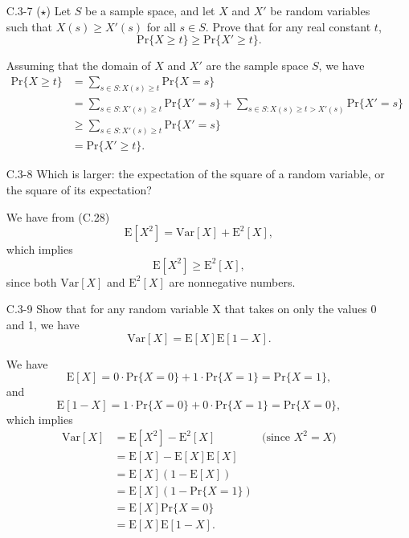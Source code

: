 \documentclass{report}
\makeatletter
\renewenvironment{framed}{%
 \def\FrameCommand##1{\hskip\@totalleftmargin
 \fboxsep=\FrameSep\fbox{##1}}%
 \MakeFramed {\advance\hsize-\width
   \@totalleftmargin\z@ \linewidth\hsize
   \@setminipage}}%
 {\par\unskip\endMakeFramed}
\makeatother
\begin{document}
\begin{enumerate}
\newpage

\item[C.3{-}7]{($\star$) Let $S$ be a sample space, and let $X$ and $X'$ be
random variables such that $X(s) \ge X'(s)$ for all $s \in S$. Prove that for
any real constant $t$,
\[
  \text{Pr}\{X \ge t\} \ge \text{Pr}\{X' \ge t\}.
\]
}

\begin{framed}
Assuming that the domain of $X$ and $X'$ are the sample space $S$, we have
\begin{equation*}
\begin{aligned}
  \text{Pr}\{X \ge t\} &=   \sum_{s \in S:X(s) \ge t}{\text{Pr}\{X = s\}}\\
                       &=   \sum_{s \in S:X'(s) \ge t}{\text{Pr}\{X' = s\}} + \sum_{s \in S:X(s) \ge t > X'(s)}{\text{Pr}\{X' = s\}}\\
                       &\ge \sum_{s \in S:X'(s) \ge t}{\text{Pr}\{X' = s\}}\\
                       &=   \text{Pr}\{X' \ge t\}.
\end{aligned}
\end{equation*}
\end{framed}

\item[C.3{-}8]{Which is larger: the expectation of the square of a random
variable, or the square of its expectation?}

\begin{framed}
We have from (C.28)
\[
  \text{E}[X^2] = \text{Var}[X] + \text{E}^2[X],
\]
which implies
\[
  \text{E}[X^2] \ge \text{E}^2[X],
\]
since both $\text{Var}[X]$ and $\text{E}^2[X]$ are nonnegative numbers.

\end{framed}

\item[C.3{-}9]{Show that for any random variable X that takes on only the values
0 and 1, we have
\[
  \text{Var}[X] = \text{E}[X] \text{E}[1 - X].
\]
}

\begin{framed}
We have
\[
  \text{E}[X] = 0 \cdot \text{Pr}\{X = 0\} + 1 \cdot \text{Pr}\{X = 1\} = \text{Pr}\{X = 1\},
\]
and
\[
  \text{E}[1 - X] = 1 \cdot \text{Pr}\{X = 0\} + 0 \cdot \text{Pr}\{X = 1\} = \text{Pr}\{X = 0\},
\]
which implies
\begin{equation*}
\begin{aligned}
  \text{Var}[X] &= \text{E}[X^2] - \text{E}^2[X] & \text{(since $X^2 = X$)}\\
                &= \text{E}[X] - \text{E}[X] \text{E}[X]\\
                &= \text{E}[X] (1 - \text{E}[X])\\
                &= \text{E}[X] (1 - \text{Pr}\{X = 1\})\\
                &= \text{E}[X] \text{Pr}\{X = 0\}\\
                &= \text{E}[X] \text{E}[1 - X].
\end{aligned}
\end{equation*}
\end{framed}


\end{enumerate}
\end{document}
